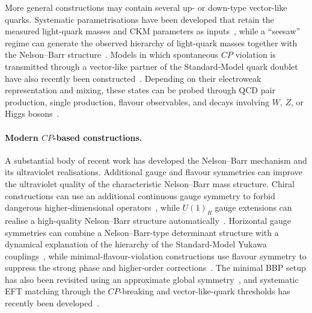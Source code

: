 \documentclass[review]{elsarticle}
\numberwithin{equation}{section}
\numberwithin{table}{section}
\numberwithin{figure}{section}
\begin{document}
More general constructions may contain several up- or down-type vector-like quarks. Systematic parametrisations have been developed that retain the measured light-quark masses and CKM parameters as inputs~\cite{Alves:2023cmw}, while a ``seesaw'' regime can generate the observed hierarchy of light-quark masses together with the Nelson--Barr structure~\cite{Cherchiglia:2024ssz}. Models in which spontaneous $CP$ violation is transmitted through a vector-like partner of the Standard-Model quark doublet have also recently been constructed~\cite{Alves:2026hog}. Depending on their electroweak representation and mixing, these states can be probed through QCD pair production, single production, flavour observables, and decays involving $W$, $Z$, or Higgs bosons~\cite{Cherchiglia:2020kut,Cherchiglia:2021vhe,Alves:2023cmw,Alves:2023ufm,Alves:2026hog}.

\paragraph{Modern $CP$-based constructions.}

A substantial body of recent work has developed the Nelson--Barr mechanism and its ultraviolet realisations. Additional gauge and flavour symmetries can improve the ultraviolet quality of the characteristic Nelson--Barr mass structure. Chiral constructions can use an additional continuous gauge symmetry to forbid dangerous higher-dimensional operators~\cite{Asadi:2022vys}, while $U(1)_R$ gauge extensions can realise a high-quality Nelson--Barr structure automatically~\cite{Perez:2023zin}. Horizontal gauge symmetries can combine a Nelson--Barr-type determinant structure with a dynamical explanation of the hierarchy of the Standard-Model Yukawa couplings~\cite{Choi:2019omm}, while minimal-flavour-violation constructions use flavour symmetry to suppress the strong phase and higher-order corrections~\cite{Bai:2022nat}. The minimal BBP setup has also been revisited using an approximate global symmetry~\cite{Murai:2024alz}, and systematic EFT matching through the $CP$-breaking and vector-like-quark thresholds has recently been developed~\cite{Alves:2025owr}.
\end{document}
